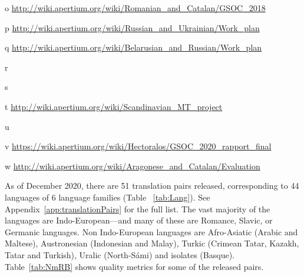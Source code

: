 \documentclass[free]{flammie}
\begin{document}
\begin{table*}[ht]
{\begin{threeparttable}
\begin{tablenotes}
\item[o] \url{http://wiki.apertium.org/wiki/Romanian_and_Catalan/GSOC_2018} \\
\item[p] \url{http://wiki.apertium.org/wiki/Russian_and_Ukrainian/Work_plan} \\
\item[q] \url{http://wiki.apertium.org/wiki/Belarusian_and_Russian/Work_plan} \\
\item[r] \cite{martinez2012free} \\
\item[s] \cite{peradin2012rule} \\
\item[t] \url{http://wiki.apertium.org/wiki/Scandinavian_MT_project}\\
\item[u] \cite{tyers2009apertiumcy}\\
\item[v] \url{https://wiki.apertium.org/wiki/Hectoralos/GSOC_2020_rapport_final}\\
\item[w] \url{http://wiki.apertium.org/wiki/Aragonese_and_Catalan/Evaluation}
\end{tablenotes}
\end{threeparttable}
}
\end{table*}


As of December 2020, there are 51 translation pairs released, corresponding to
44 languages of 6 language families (Table ~\ref{tab:Lang}). See
Appendix~\ref{app:translationPairs} for the full list. The vast majority of the
languages are Indo-European---and many of these are Romance, Slavic, or Germanic
languages. Non Indo-European languages are Afro-Asiatic (Arabic and Maltese),
Austronesian (Indonesian and Malay), Turkic (Crimean Tatar, Kazakh, Tatar and
Turkish), Uralic (North-Sámi) and isolates (Basque). Table~\ref{tab:NmRB} shows
quality metrics for some of the released pairs.
\end{document}
